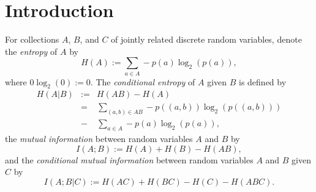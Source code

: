 \documentclass[10pt,journal]{IEEEtran}
\begin{document}
\begin{abstract}
Any unconstrained information inequality in three or fewer random variables can be written
as a linear combination of instances of Shannon's inequality $I(A;B|C) \ge 0$.
Such inequalities are sometimes
referred to as ``Shannon" inequalities.
In 1998, Zhang and Yeung gave the first example of
a ``non-Shannon" information inequality in four variables.  Their technique was to add
two auxiliary variables with special properties and then apply Shannon inequalities to
the enlarged list.  Here we will show that the Zhang-Yeung inequality can actually be derived from
just one auxiliary variable.  Then we use their same basic technique of adding auxiliary variables
to give many other non-Shannon inequalities in four variables.  Our list includes the inequalities found
by Xu, Wang, and Sun, but it is by no means exhaustive.
Furthermore, some of the inequalities obtained may be superseded by stronger inequalities that have
yet to be found.  Indeed, we show that the Zhang-Yeung inequality is one of those that is superseded.
We also present several infinite
families of inequalities.  This list includes some, but not all of the infinite families found by Matus.
Then we will give a description of what additional information these inequalities tell us about entropy space.
This will include a conjecture on the maximum possible failure of Ingleton's inequality.
Finally, we will present an application of non-Shannon inequalities to network coding.  We will demonstrate
how these inequalities are useful in finding bounds on the information that can flow through a particular network
called the Vamos network.
\end{abstract}


\date{}
\maketitle

\section{Introduction}
\label{sec:information-inequalities}

For collections $A$, $B$, and $C$ of jointly related discrete random variables,
denote the \textit{entropy} of $A$ by
$$H(A):=\sum_{a\in A}-p(a)\log_2(p(a)), $$
where $0\log_2(0):=0$.
The \textit{conditional entropy} of $A$ given $B$ is defined by
\begin{eqnarray}
H(A|B)&:=&H(AB)-H(A) \label{condEntropy}\\
&=&\sum_{(a,b)\in AB}-p((a,b))\log_2(p((a,b))) \nonumber\\
&-& \sum_{a\in A}-p(a)\log_2(p(a)),\nonumber
\end{eqnarray}
the \textit{mutual information} between random variables $A$ and $B$ by
$$I(A;B):= H(A)+H(B)-H(AB),$$
and the \textit{conditional mutual information} between random variables
$A$ and $B$ given $C$ by
$$I(A;B|C):=H(AC)+H(BC)-H(C)-H(ABC).$$
\end{document}
